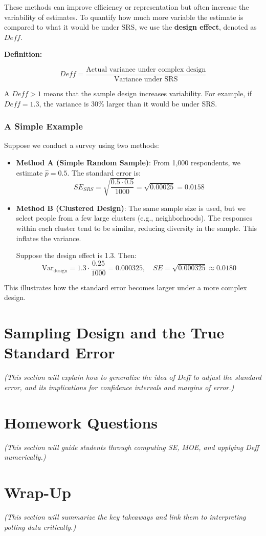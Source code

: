 \documentclass[12pt]{article}
\begin{document}
These methods can improve efficiency or representation but often increase the variability of estimates. To quantify how much more variable the estimate is compared to what it would be under SRS, we use the \textbf{design effect}, denoted as \(Deff\).

\textbf{Definition:}

\[
Deff = \frac{ \text{Actual variance under complex design} }{ \text{Variance under SRS} }
\]

A \(Deff > 1\) means that the sample design increases variability. For example, if \(Deff = 1.3\), the variance is 30\% larger than it would be under SRS.

\subsubsection*{A Simple Example}

Suppose we conduct a survey using two methods:
\begin{itemize}
  \item \textbf{Method A (Simple Random Sample)}: From 1,000 respondents, we estimate \(\hat{p} = 0.5\). The standard error is:
  \[
  SE_{SRS} = \sqrt{ \frac{0.5 \cdot 0.5}{1000} } = \sqrt{0.00025} = 0.0158
  \]
  \item \textbf{Method B (Clustered Design)}: The same sample size is used, but we select people from a few large clusters (e.g., neighborhoods). The responses within each cluster tend to be similar, reducing diversity in the sample. This inflates the variance.

  Suppose the design effect is 1.3. Then:
  \[
  \text{Var}_{\text{design}} = 1.3 \cdot \frac{0.25}{1000} = 0.000325, \quad SE = \sqrt{0.000325} \approx 0.0180
  \]
\end{itemize}

This illustrates how the standard error becomes larger under a more complex design.

\section*{Sampling Design and the True Standard Error}

\textit{(This section will explain how to generalize the idea of Deff to adjust the standard error, and its implications for confidence intervals and margins of error.)}

\section*{Homework Questions}

\textit{(This section will guide students through computing SE, MOE, and applying Deff numerically.)}

\section*{Wrap-Up}

\textit{(This section will summarize the key takeaways and link them to interpreting polling data critically.)}
\end{document}
